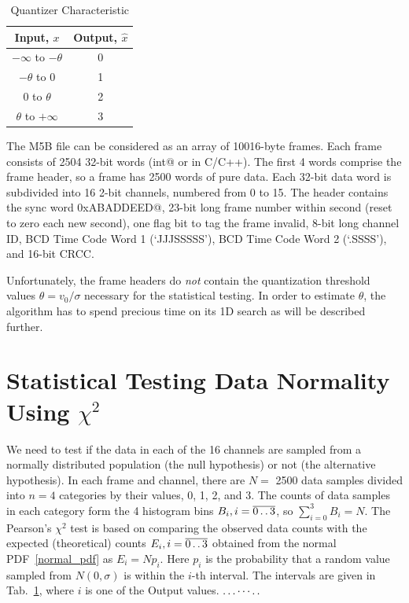 \documentclass[letterpaper,twoside,12pt]{article}
\newcommand{\twodots}{\mathinner {\ldotp \ldotp}}
\begin{document}
\begin{table}[ht!]
  \begin{center}
    \caption{Quantizer Characteristic}
    \label{quant_io}
    \begin{tabular}{c|c}
      \textbf{Input, $x$} & \textbf{Output, $\hat{x}$} \\
      \hline
      $-\infty$ to $-\theta$ & 0 \\
      $-\theta$ to 0         & 1 \\
      0 to $\theta$          & 2 \\
      $\theta$ to $+\infty$  & 3 \\
    \end{tabular}
  \end{center}
\end{table}


The M5B file can be considered as an array of 10016-byte frames. Each frame consists of 2504 32-bit words (\verb@unsigned int@ or  \verb@uint@ in C/C++). The first 4 words comprise the frame header, so a frame has 2500 words of pure data. Each 32-bit data word is subdivided into 16 2-bit channels, numbered from 0 to 15. The header contains the sync word \verb@0xABADDEED@, 23-bit long frame number within second (reset to zero each new second), one flag bit to tag the frame invalid, 8-bit long channel ID, BCD Time Code Word 1 (‘JJJSSSSS’), BCD Time Code Word 2 (‘.SSSS’), and  16-bit CRCC.

Unfortunately, the frame headers do \emph{not} contain the quantization threshold values $\theta = v_0/\sigma$ necessary for the statistical testing. In order to estimate $\theta$, the algorithm has to spend precious time on its 1D search as will be described further. 




\section{Statistical Testing Data Normality Using $\chi^2$}

We need to test if the data in each of the 16 channels are sampled from a normally distributed population (the null hypothesis) or not (the alternative hypothesis). In each frame and channel, there are $N=$ 2500 data samples divided into $n=4$ categories by their values, 0, 1, 2, and 3. The counts of data samples in each category form the 4 histogram bins $B_i, i=\overline{0 \twodots 3}$, so $\sum_{i=0}^3 B_i = N$. The Pearson's $\chi^2$ test is based on comparing the observed data counts with the expected (theoretical) counts $E_i, i=\overline{0 \twodots 3}$ obtained from the normal PDF~\eqref{normal_pdf} as $E_i = Np_i$. Here $p_i$ is the probability that a random value sampled from $N(0,\sigma)$ is within the $i$-th interval. The intervals are given in Tab.~\ref{quant_io}, where $i$ is one of the Output values. $\ldots\cdots\ldotp\ldotp$
\end{document}
